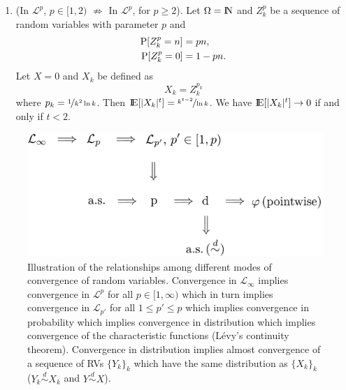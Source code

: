 \documentclass[a4paper,10pt]{scrbook}
\begin{document}
\begin{enumerate}
 \item (In $\mathcal{L}^p$, $p\in[1,2)$ $\not\Rightarrow$ In $\mathcal{L}^p$, for $p\geq 2$).
       Let $\Omega=\N$ and $Z_k^p$ be a sequence of random variables with parameter $p$ and 
       \begin{align*}
        \mathrm{P}[Z_k^p=n] &= pn,\\
        \mathrm{P}[Z_k^p=0] &= 1-pn.
       \end{align*}
       Let $X=0$ and $X_k$ be defined as
       \[
        X_k = Z_{k}^{p_k}
       \]
       where $p_k=\nicefrac{1}{k^2 \ln k}$. 
       Then $\E[|X_k|^t]=\nicefrac{k^{t-2}}{\ln k}$. 
       We have $\E[|X_k|^t]\to 0$ if and only if $t<2$.
\end{enumerate}
\begin{figure}
 \centering
 \includegraphics[width=0.6\linewidth]{figures/convergence_rv}
 \caption{Illustration of the relationships among different modes of convergence of random variables. 
         Convergence in $\mathcal{L}_\infty$ implies convergence in $\mathcal{L}^p$ for all $p\in[1,\infty)$
         which in turn implies convergence in $\mathcal{L}_{p'}$ for all $1\leq p' \leq p$ which implies 
         convergence in probability which implies convergence in distribution which implies 
         convergence of the characteristic functions (L\'evy's continuity theorem). 
         Convergence in distribution implies almost 
         convergence of a sequence of RVs $\{Y_k\}_k$ which have the same distribution as 
         $\{X_k\}_k$ ($Y_k \overset{d}{\sim} X_k$ and $Y \overset{d}{\sim} X$).
         }
\end{figure}
\end{document}
